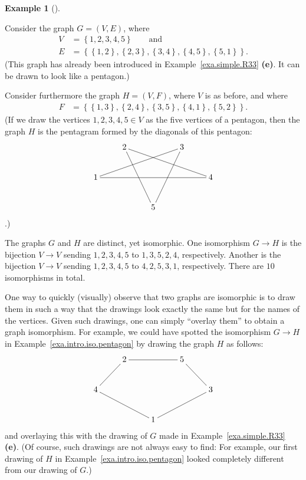 \documentclass[numbers=enddot,12pt,final,onecolumn,notitlepage]{scrartcl}%
\makeatletter
\theoremstyle{definition}
\newtheorem{exam}[theo]{Example}
\newenvironment{example}[1][]
{\begin{exam}[#1]\begin{leftbar}}
{\end{leftbar}\end{exam}}
\newcommand{\set}[1]{\left\{ #1 \right\}}
\newcommand{\tup}[1]{\left( #1 \right)}
\newcommand{\are}{\ar@{-}}
\makeatother
\begin{document}
\begin{example} \label{exa.intro.iso.pentagon}
Consider the graph $G = \tup{V, E}$, where
\begin{align*}
V &= \set{1, 2, 3, 4, 5} \qquad \text{and} \\
E &= \set{\set{1,2}, \set{2,3}, \set{3,4}, \set{4,5}, \set{5,1}} .
\end{align*}
(This graph has already been introduced in
Example~\ref{exa.simple.R33} \textbf{(e)}. It can be drawn to look
like a pentagon.)

Consider furthermore the graph $H = \tup{V, F}$, where $V$ is as
before, and where
\begin{align*}
F &= \set{\set{1,3}, \set{2,4}, \set{3,5}, \set{4,1}, \set{5,2}} .
\end{align*}
(If we draw the vertices $1,2,3,4,5 \in V$ as the five vertices of a
pentagon, then the graph $H$ is the pentagram formed by the diagonals
of this pentagon:
\begin{align*}
\xymatrix{
& 2 \are[rrrd] \are[rdd] & & 3 \are[llld] \are[ldd] \\
1 \are[rrrr] & & & & 4 \\
& & 5
}
\end{align*}
.)

The graphs $G$ and $H$ are distinct, yet isomorphic. One isomorphism
$G \to H$ is the bijection $V \to V$ sending $1,2,3,4,5$ to
$1,3,5,2,4$, respectively. Another is the bijection $V \to V$ sending
$1,2,3,4,5$ to $4,2,5,3,1$, respectively. There are $10$ isomorphisms
in total.
\end{example}

One way to quickly (visually) observe that two graphs are isomorphic
is to draw them in such a way that the drawings look exactly the same
but for the names of the vertices. Given such drawings, one can simply
``overlay them'' to obtain a graph isomorphism.
For example, we could have spotted the isomorphism $G \to H$ in
Example~\ref{exa.intro.iso.pentagon} by drawing the graph $H$ as
follows:
\begin{align*}
\xymatrix{
& 2 \are[rr] & & 5 \are[rd] \\
4 \are[ru] \are[rrd] & & & & 3 \are[lld] \\
& & 1
}
\end{align*}
and overlaying this with the drawing of $G$ made in
Example~\ref{exa.simple.R33} \textbf{(e)}.
(Of course, such drawings are not always easy to find: For example,
our first drawing of $H$ in Example~\ref{exa.intro.iso.pentagon}
looked completely different from our drawing of $G$.)
\end{document}
